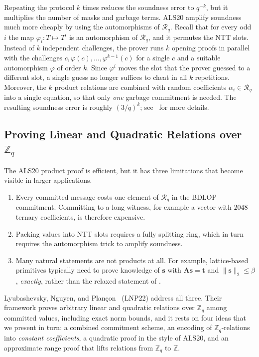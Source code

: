 \documentclass[../../book.tex]{subfiles}
\begin{document}
Repeating the protocol $k$ times reduces the soundness error to $q^{-k}$, but it multiplies the number of masks and garbage terms.
ALS20 amplify soundness much more cheaply by using the automorphisms of $\mathcal{R}_q$.
Recall that for every odd $i$ the map $\varphi_i: T \mapsto T^i$ is an automorphism of $\mathcal{R}_q$, and it permutes the NTT slots.
Instead of $k$ independent challenges, the prover runs $k$ opening proofs in parallel with the challenges $c, \varphi(c), \dots, \varphi^{k-1}(c)$ for a single $c$ and a suitable automorphism $\varphi$ of order $k$.
Since $\varphi^i$ moves the slot that the prover guessed to a different slot, a single guess no longer suffices to cheat in all $k$ repetitions.
Moreover, the $k$ product relations are combined with random coefficients $\alpha_i \in \mathcal{R}_q$ into a single equation, so that only \emph{one} garbage commitment is needed.
The resulting soundness error is roughly $(3/q)^k$; see~\cite[Section 5]{C:AttLyuSei20} for more details.

\subsection{Proving Linear and Quadratic Relations over $\mathbb{Z}_q$}\label{section:lnp22}

The ALS20 product proof is efficient, but it has three limitations that become visible in larger applications.
\begin{enumerate}
    \item[\textit{(i)}] Every committed message costs one element of $\mathcal{R}_q$ in the BDLOP commitment. Committing to a long witness, for example a vector with $2048$ ternary coefficients, is therefore expensive.
    \item[\textit{(ii)}] Packing values into NTT slots requires a fully splitting ring, which in turn requires the automorphism trick to amplify soundness.
    \item[\textit{(iii)}] Many natural statements are not products at all. For example, lattice-based primitives typically need to prove knowledge of $\mathbf{s}$ with $\mathbf{A}\mathbf{s} = \mathbf{t}$ and $\|\mathbf{s}\|_2 \leq \beta$, \emph{exactly}, rather than the relaxed statement of .
\end{enumerate}
Lyubashevsky, Nguyen, and Plan\c{c}on~\cite{C:LyuNguPla22} (LNP22) address all three.
Their framework proves arbitrary linear and quadratic relations over $\mathbb{Z}_q$ among committed values, including exact norm bounds, and it rests on four ideas that we present in turn: a combined commitment scheme, an encoding of $\mathbb{Z}_q$-relations into \emph{constant coefficients}, a quadratic proof in the style of ALS20, and an approximate range proof that lifts relations from $\mathbb{Z}_q$ to $\mathbb{Z}$.
\end{document}
